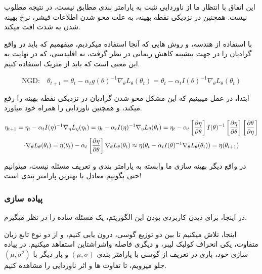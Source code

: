 این اتفاق با انتظار ما از ناوردایی نثبت به پارامتر بندی مطابق نیست، در نتیجه مطلوب نیست.
همچنین در نزدیکی نقطه بهینه، به علت محو شدن اطلاعات فیشر، نرخ بهینه شدن به شدت افت میکند.

با استفاده از هندسه، و روش هایی که آنجا استفاده میکردیم، میفهمیم که باید در واقع گرادیان را در جهت بیشینه کاهش ریمانی در نظر گرفت، نه اقلیدسی، که در نهایت به این معنی است که باید از متریک استفاده کنیم.

$$
	\text{NGD:}\quad \theta_{t+1}=\theta_t-\alpha_tg(\theta)^{-1}\nabla_\theta L_\theta(\theta_t)=\theta_t-\alpha_tI(\theta)^{-1}\nabla_\theta L_\theta(\theta_t)
$$

ابتدا، در عمل میبینیم که این مشکل محو شدن گرادیان در نزدیکی نقطه بهینه را رفع میکند، و همچنین ناوردایی را همراه خود میاورد.

\begin{multline*}
	\eta_{t+1}=\eta_t-\alpha_tI(\eta)^{-1}\nabla_\eta L_\eta(\eta_t)=\eta_t-\alpha_tI(\eta)^{-1}\nabla_\eta L_\theta(\theta_t)
	=\eta_t-\alpha_t\left[\frac{\partial \eta}{\partial \theta}\right]I(\theta)^{-1}\left[\frac{\partial \eta}{\partial \theta}\right]\left[\frac{\partial \theta}{\partial \eta}\right]\-\\\-\cdot\nabla_\theta L_\theta(\theta_t)=\eta(\theta_t)-\alpha_t\left[\frac{\partial \eta}{\partial \theta}\right]\nabla_\theta L_\theta(\theta_t)\approx\eta(\theta_t-\alpha_tI(\theta)^{-1}\nabla_\theta L_\theta(\theta_t))= \eta(\theta_{t+1})
\end{multline*}

در واقع دیگر بهینه سازی ما وابسته به پارامتر بندی و تعریف مسئله نیست، میتوانیم حتی بگوییم معادل با بهترین پارامتر بندی است!

\subsubsection{پیاده سازی}

در اینجا، برای دیدن کاربردی بودن این الگوریتم، یک مسئله ساده را در نظر میگیرم.

اینجا، تلاش میکنیم تا بین دو توزیع گوسی، درون یابی کنیم، و از دو نوع تابع زیان متفاوت، یکی انحراف کولبک لیبر، و دیگری فاصله واشراشتاین استفاهد میکنیم.
در پیاده سازی خود، باری در تعریف از گوسی با پارامتر بندی $(\mu,\sigma)$ و بار دیگر با $(\mu, \sigma^2)$ جلو میرویم، تا تفاوت ها و اثر ناوردایی را مشاهده کنیم.

